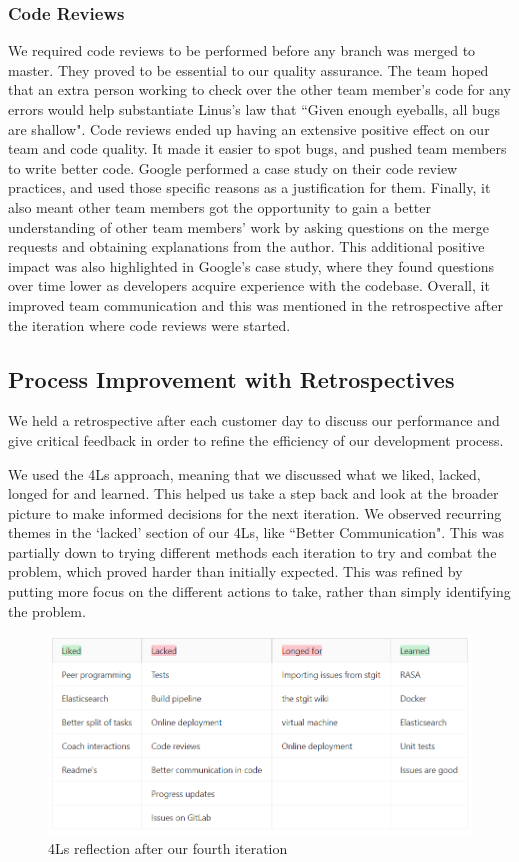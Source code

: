 \documentclass{l3proj}
\begin{document}
\subsubsection{Code Reviews}
We required code reviews to be performed before any branch was merged to master. They proved to be essential to our quality assurance. The team hoped that an extra person working to check over the other team member’s code for any errors would help substantiate Linus's law that ``Given enough eyeballs, all bugs are shallow"\cite{cathedral:Raymond}. Code reviews ended up having an extensive positive effect on our team and code quality. It made it easier to spot bugs, and pushed team members to write better code. Google performed a case study on their code review practices, and used those specific reasons as a justification for them\cite{codereview:Google}. Finally, it also meant other team members got the opportunity to gain a better understanding of other team members' work by asking questions on the merge requests and obtaining explanations from the author. This additional positive impact was also highlighted in Google's case study, where they found questions over time lower as developers acquire experience with the codebase\cite{codereview:Google}. Overall, it improved team communication and this was mentioned in the retrospective after the iteration where code reviews were started.

\subsection{Process Improvement with Retrospectives}

We held a retrospective after each customer day to discuss our performance and give critical feedback in order to refine the efficiency of our development process\cite{agilemanifesto}.

We used the 4Ls approach, meaning that we discussed what we liked, lacked, longed for and learned. This helped us take a step back and look at the broader picture to make informed decisions for the next iteration. We observed recurring themes in the `lacked' section of our 4Ls, like ``Better Communication". This was partially down to trying different methods each iteration to try and combat the problem, which proved harder than initially expected. This was refined by putting more focus on the different actions to take, rather than simply identifying the problem.

\begin{figure}[h!]
    \centering
    \includegraphics[width=0.85\linewidth]{figures/Process_Improvement.png}
    \caption{4Ls reflection after our fourth iteration}
\end{figure}
\end{document}

